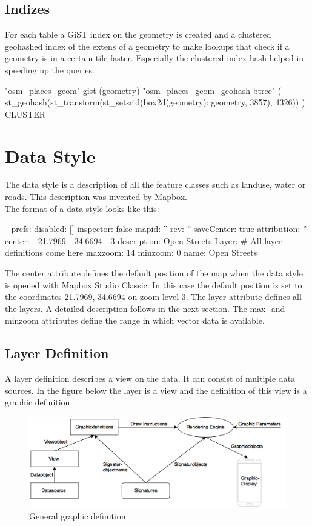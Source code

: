 \subsection{Indizes}

For each table a GiST\cite{87_postgresql.org_2015} index on the geometry
is created and a clustered geohashed index of the extens of a geometry\cite{88_postgis.net_2015} to make lookups that check if a geometry is in a certain tile faster. Especially the clustered index hash helped in speeding up the queries.

\begin{sqlcode}
"osm_places_geom" gist (geometry)
"osm_places_geom_geohash btree" (
    st_geohash(st_transform(st_setsrid(box2d(geometry)::geometry, 3857), 4326))
) CLUSTER
\end{sqlcode}

\section{Data Style}\label{data_style}

The data style is a description of all the feature classes such as landuse, water or roads. This description was invented by Mapbox.
\\
The format of a data style looks like this:
\begin{yamlcode}
_prefs: 
  disabled: []
  inspector: false
  mapid: ''
  rev: ''
  saveCenter: true
attribution: ''
center: 
  - 21.7969
  - 34.6694
  - 3
description: Open Streets
Layer: 
    # All layer definitions come here
maxzoom: 14
minzoom: 0
name: Open Streets
\end{yamlcode}
The center attribute defines the default position of the map when the data style is opened with Mapbox Studio Classic. In this case the default position is set to the coordinates 21.7969, 34.6694 on zoom level 3. The layer attribute defines all the layers. A detailed description follows in the next section. The max- and minzoom attributes define the range in which vector data is available.
\newpage
\subsection{Layer Definition}\label{layer_definition}
A layer definition describes a view on the data. It can consist of multiple data sources. In the figure below the layer is a view and the definition of this view is a graphic definition.

\begin{figure}[H]
\centering
  \includegraphics[width=1\textwidth]{images/graphic_definition.png}
  \caption{General graphic definition}
\end{figure}

